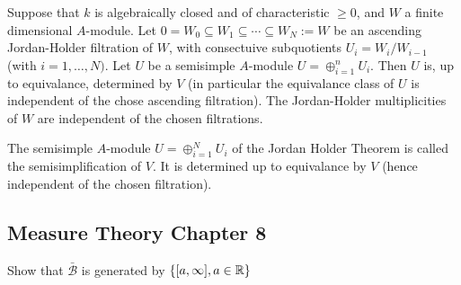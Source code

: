 \begin{thm}
Suppose that \(k\) is algebraically closed and of characteristic \(\geq 0\), and \(W\) a finite dimensional \(A\)-module. Let \(0=W_{0}\subseteq W_{1}\subseteq \cdots \subseteq W_N:=W\) be an ascending Jordan-Holder filtration of \(W\), with consectuive subquotients \(U_{i}=W_{i}/W_{i-1}\) (with \(i=1,\ldots ,N)\). Let \(U\) be a semisimple \(A\)-module \(U=\oplus _{i=1}^nU_{i}\). Then \(U\) is, up to equivalance, determined by \(V\) (in particular the equivalance class of \(U\) is independent of the chose ascending filtration). The Jordan-Holder multiplicities of \(W\) are independent of the chosen filtrations.
\end{thm}

\begin{defn}
The semisimple \(A\)-module \(U=\oplus _{i=1}^NU_{i}\) of the Jordan Holder Theorem is called the semisimplification of \(V\). It is determined up to equivalance by \(V\) (hence independent of the chosen filtration).
\end{defn}

\subsection{Measure Theory Chapter 8}
\begin{prop}
Show that \(\bar{\mathcal{B}}\) is generated by \(\{[a,\infty ],a\in \Bbb{R}\}\)
\end{prop}

